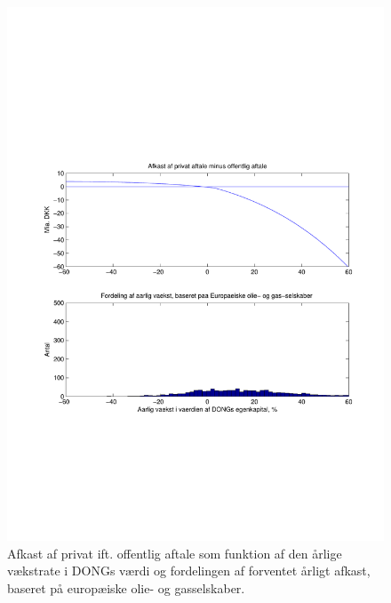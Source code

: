 \documentclass{article}
\begin{document}
\begin{figure}
\includegraphics[scale=0.8]{../matlab/figs/afkast_hist_combine_oilgas}
\caption{Afkast af privat ift. offentlig aftale som funktion af den \aa{}rlige v\ae{}kstrate i DONGs v\ae{}rdi og fordelingen af forventet \aa{}rligt afkast, baseret p\aa{} europ\ae{}iske olie- og gasselskaber.}
\label{fig:combine2}
\end{figure}
\end{document}

